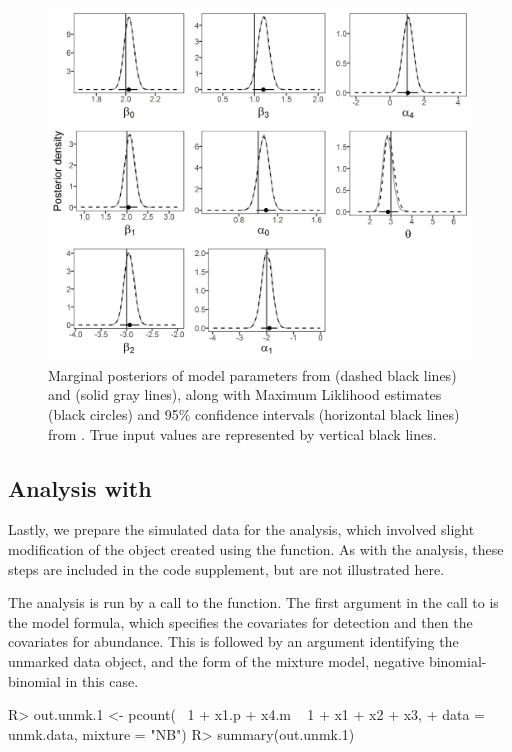 \documentclass[codesnippet]{jss}
\begin{document}
\begin{figure}
\includegraphics[width=\linewidth]{fig1.png}
\caption{Marginal posteriors of model parameters from  (dashed black lines) and  (solid gray lines), along with Maximum Liklihood estimates (black circles) and 95\% confidence intervals (horizontal black lines) from .  True input values are represented by vertical black lines.}
\label{fig:fig1}
\end{figure}

\subsection[Analysis with unmarked]{Analysis with }
Lastly, we prepare the simulated data for the  analysis, which involved slight modification of the  object created using the  function. As with the  analysis, these steps are included in the code supplement, but are not illustrated here.

The  analysis is run by a call to the  function. The first argument in the call to  is the model formula, which specifies the covariates for detection and then the covariates for abundance. This is followed by an argument identifying the unmarked data object, and the form of the mixture model, negative binomial-binomial in this case.

\begin{CodeInput}
R> out.unmk.1 <- pcount(~ 1 + x1.p + x4.m ~ 1 + x1 + x2 + x3,
+    data = unmk.data, mixture = "NB")
R> summary(out.unmk.1)
\end{CodeInput}
\end{document}
